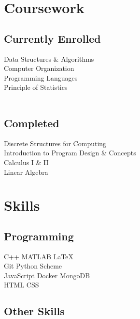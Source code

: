 \documentclass[letterpaper]{deedy-resume} %
\begin{document}
\begin{minipage}[t]{0.33\textwidth}
\section{Coursework} 
\subsection{Currently Enrolled}

Data Structures \& Algorithms \\
Computer Organization \\
Programming Languages \\ 
Principle of Statistics \\ \ \\

\subsection{Completed}
Discrete Structures for Computing \\
Introduction to Program Design \& Concepts \\
Calculus I \& II \\
Linear Algebra \\

\sectionspace %


\section{Skills}

\subsection{Programming}

\textbullet{} C++ \textbullet{} MATLAB \textbullet{} \LaTeX\ \\
\textbullet{} Git  \textbullet{} Python \textbullet{} Scheme \\ \textbullet{} JavaScript \textbullet{} Docker \textbullet{} MongoDB \\ \textbullet{} HTML \textbullet{} CSS

\vspace{5pt}
\subsection{Other Skills}


\end{minipage}
\end{document}
